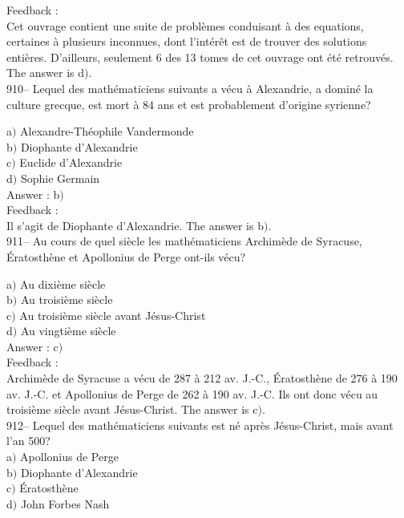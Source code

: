 \documentclass[letterpaper, 12pt]{article}
\begin{document}
Feedback : \\
Cet ouvrage contient une suite de probl\`emes conduisant \`a des
equations, certaines \`a plusieurs inconnues, dont l'int\'er\^et
est de trouver des solutions enti\`eres.
D'ailleurs, seulement 6 des 13 tomes de cet ouvrage ont \'et\'e retrouv\'es.
The answer is d$)$.\\

910-- Lequel des math\'ematiciens suivants a v\'ecu \`a Alexandrie,
a domin\'e la culture grecque, est mort \`a 84 ans et est
probablement d'origine syrienne?

a$)$ Alexandre-Th\'eophile Vandermonde \\
b$)$ Diophante d'Alexandrie \\
c$)$ Euclide d'Alexandrie \\
d$)$ Sophie Germain\\

Answer : b$)$\\

Feedback : \\
Il s'agit de Diophante d'Alexandrie. The answer is b$)$.\\

911-- Au cours de quel si\`ecle les math\'ematiciens Archim\`ede de
Syracuse, \'Eratosth\`ene et Apollonius de Perge ont-ils v\'ecu?

a$)$ Au dixi\`eme si\`ecle \\
b$)$ Au troisi\`eme si\`ecle \\
c$)$ Au troisi\`eme si\`ecle avant J\'esus-Christ \\
d$)$ Au vingti\`eme si\`ecle   \\

Answer : c$)$\\

Feedback : \\
Archim\`ede de Syracuse a v\'ecu de 287 \`a 212 av. J.-C.,
\'Eratosth\`ene de 276 \`a 190 av. J.-C. et Apollonius de Perge de 262 \`a
190 av. J.-C. Ils ont donc v\'ecu au troisi\`eme si\`ecle avant
J\'esus-Christ. The answer is c$)$.\\

912-- Lequel des math\'ematiciens suivants est n\'e apr\`es J\'esus-Christ,
mais avant l'an 500?\\

a$)$ Apollonius de Perge \\
b$)$ Diophante d'Alexandrie \\
c$)$ \'Eratosth\`ene \\
d$)$ John Forbes Nash  \\
\end{document}
